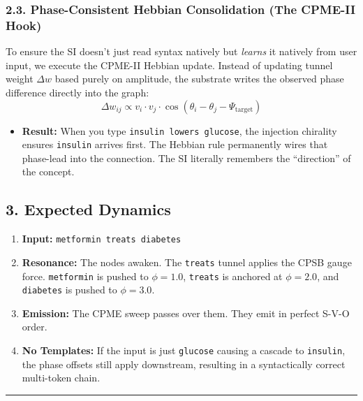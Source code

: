 \documentclass[
  11pt,
  a4paper,
]{article}
\providecommand{\tightlist}{%
  \setlength{\itemsep}{0pt}\setlength{\parskip}{0pt}}
\begin{document}
\subsubsection{2.3. Phase-Consistent Hebbian Consolidation (The CPME-II
Hook)}\label{phase-consistent-hebbian-consolidation-the-cpme-ii-hook}

To ensure the SI doesn't just read syntax natively but \emph{learns} it
natively from user input, we execute the CPME-II Hebbian update. Instead
of updating tunnel weight \(\Delta w\) based purely on amplitude, the
substrate writes the observed phase difference directly into the graph:
\[ \Delta w_{ij} \propto v_i \cdot v_j \cdot \cos(\theta_i - \theta_j - \Psi_{\text{target}}) \]

\begin{itemize}
\tightlist
\item
  \textbf{Result:} When you type \texttt{insulin\ lowers\ glucose}, the
  injection chirality ensures \texttt{insulin} arrives first. The
  Hebbian rule permanently wires that phase-lead into the connection.
  The SI literally remembers the ``direction'' of the concept.
\end{itemize}

\subsection{3. Expected Dynamics}\label{expected-dynamics}

\begin{enumerate}
\def\labelenumi{\arabic{enumi}.}
\tightlist
\item
  \textbf{Input:} \texttt{metformin\ treats\ diabetes}
\item
  \textbf{Resonance:} The nodes awaken. The \texttt{treats} tunnel
  applies the CPSB gauge force. \texttt{metformin} is pushed to
  \(\phi = 1.0\), \texttt{treats} is anchored at \(\phi = 2.0\), and
  \texttt{diabetes} is pushed to \(\phi = 3.0\).
\item
  \textbf{Emission:} The CPME sweep passes over them. They emit in
  perfect S-V-O order.
\item
  \textbf{No Templates:} If the input is just \texttt{glucose} causing a
  cascade to \texttt{insulin}, the phase offsets still apply downstream,
  resulting in a syntactically correct multi-token chain.
\end{enumerate}

\begin{center}\rule{0.5\linewidth}{0.5pt}\end{center}
\end{document}
